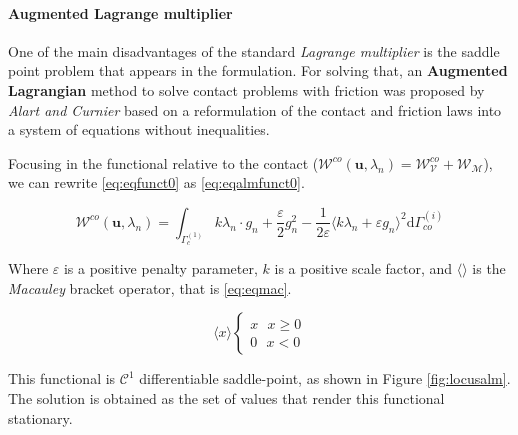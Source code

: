 \documentclass[a4paper,10pt]{article} %
\begin{document}
\paragraph{Augmented Lagrange multiplier}

One of the main disadvantages of the standard \textit{Lagrange multiplier} is the saddle point problem that appears in the formulation. For solving that, an \textbf{Augmented Lagrangian} method to solve contact problems with friction was proposed by \textit{Alart and Curnier}\cite{alart} based on a reformulation of the contact and friction laws into a system
of equations without inequalities.

Focusing in the functional relative to the contact ($\mathcal{W}^{co}(\mathbf{u},\lambda_n) = \mathcal{W}^{co}_\mathcal{V} + \mathcal{W}_\mathcal{M}$), we can rewrite \eqref{eq:eqfunct0} as \eqref{eq:eqalmfunct0}.

\begin{equation}\label{eq:eqalmfunct0}
 \mathcal{W}^{co}(\mathbf{u},\lambda_n) = \int_{\Gamma_c^{(1)}} k \lambda_n \cdot g_n  + \frac{\varepsilon}{2} g_n^2 - \frac{1}{2\varepsilon} \langle k \lambda_n + \varepsilon g_n \rangle^2\text{d}\Gamma_{co}^{(i)}
\end{equation}

Where $\varepsilon$ is a positive penalty parameter, $k$ is a positive scale factor, and $\langle \rangle$ is the \textit{Macauley} bracket operator, that is \eqref{eq:eqmac}.

\begin{equation}\label{eq:eqmac}
 \langle x \rangle \begin{cases} x \text{ } x \geq 0\\ 0 \text{ } x < 0 \end{cases}
\end{equation}

This functional is $\mathcal{C}^1$ differentiable saddle-point, as shown in Figure \ref{fig:locusalm}. The solution is obtained as the set of values that render this functional stationary.
\end{document}
